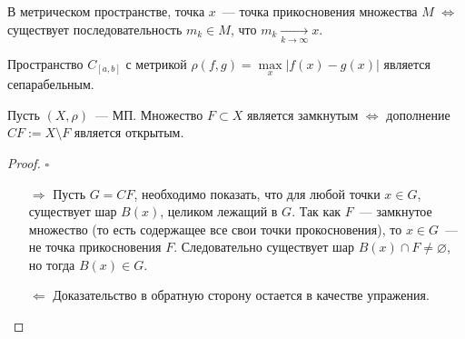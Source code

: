 \begin{exercise}
  В метрическом пространстве, точка $x$~--- точка прикосновения множества $M$ $ \Leftrightarrow $ существует последовательность $m_k \in M$, что $m_k \xrightarrow[k \to \infty]{} x$. 
\end{exercise}

\begin{exercise}
  Пространство $C_{[a,b]}$ с метрикой $\rho(f,g) = \operatorname{max}\limits_{x} |f(x) - g(x)|$ является сепарабельным.
\end{exercise}


\begin{theorem}
  Пусть $(X, \rho)$~--- МП. Множество $F \subset X$ является замкнутым $\Leftrightarrow$ дополнение  $CF := X \setminus F$ является открытым.
\end{theorem}
\begin{proof} \href{https://youtu.be/r2DT_f552TA?t=2621}{$\square$}
  
  \begin{enumerate}
    \item[$\boxed{\Rightarrow}$] 
    Пусть $G = CF$, необходимо показать, что для любой точки $x \in G$, существует  шар $B(x)$, целиком лежащий в $G$. Так как $F$~--- замкнутое множество (то есть содержащее все свои точки прокосновения), то $x\in G$~--- не точка прикосновения $F$. Следовательно существует шар $B(x) \cap F \neq \varnothing$, но тогда $B(x) \in G$.

    \item[$\boxed{\Leftarrow}$] Доказательство в обратную сторону остается в качестве упражения.
  \end{enumerate}
\end{proof}



